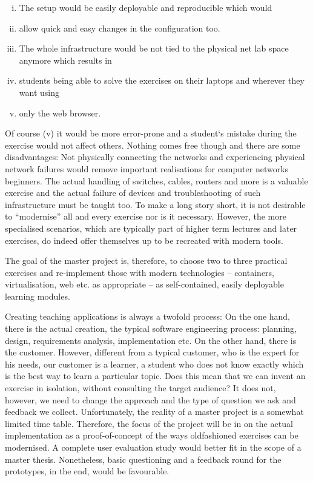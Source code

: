 \begin{enumerate}[(i)]
	\item The setup would be easily deployable and reproducible which would
	\item allow quick and easy changes in the configuration too.
	\item The whole infrastructure would be not tied to the physical net lab space anymore which results in
	\item students being able to solve the exercises on their laptops and wherever they want using
	\item only the web browser.
\end{enumerate}
Of course (v) it would be more error-prone and a student‘s mistake
during the exercise would not affect others.
Nothing comes free though and there are some disadvantages:
Not physically connecting the networks and experiencing physical network failures would remove important realisations for computer networks beginners.
The actual handling of switches, cables, routers and more is a valuable exercise and the actual failure of devices and troubleshooting of such infrastructure must be taught too.
To make a long story short, it is not desirable to \enquote{modernise}
all and every exercise nor is it necessary.
However, the more specialised scenarios,
which are typically part of higher term lectures and later exercises,
do indeed offer themselves up to be recreated with modern tools.

The goal of the master project is, therefore, to choose two to three practical exercises and re-implement those with modern technologies -- containers, virtualisation, web etc. as appropriate  -- as self-contained, easily deployable learning modules.

Creating teaching applications is always a twofold process:
On the one hand, there is the actual creation, the typical software engineering process:
planning, design, requirements analysis, implementation etc.
On the other hand, there is the customer.
However, different from a typical customer, who is the expert for his needs, our customer is a learner, a student who does not know exactly which is the best way to learn a particular topic.
Does this mean that we can invent an exercise in isolation, without consulting the target audience?
It does not, however, we need to change the approach and the type of question we ask and feedback we collect.
Unfortunately, the reality of a master project is a somewhat limited time table.
Therefore, the focus of the project will be in on the actual implementation as a proof-of-concept of the ways oldfashioned exercises can be modernised. 
A complete user evaluation study would better fit in the scope of a master thesis.
Nonetheless, basic questioning and a feedback round for the prototypes, in the end, would be favourable.

